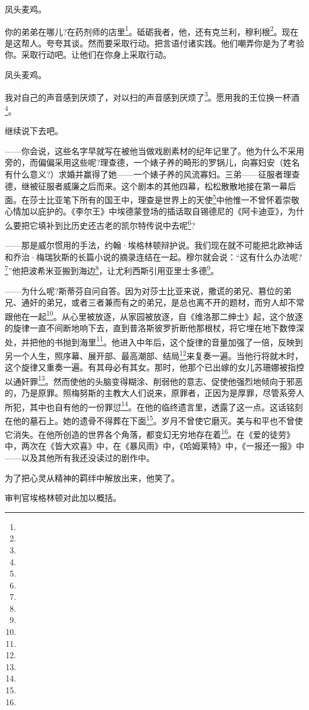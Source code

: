\par 凤头麦鸡。
\par 你的弟弟在哪儿?在药剂师的店里\footnote{}。砥砺我者，他，还有克兰利，穆利根\footnote{}。现在是这帮人。夸夸其谈。然而要采取行动。把言语付诸实践。他们嘲弄你是为了考验你。采取行动吧。让他们在你身上采取行动。
\par 凤头麦鸡。
\par 我对自己的声音感到厌烦了，对以扫的声音感到厌烦了\footnote{}。愿用我的王位换一杯酒\footnote{}。
\par 继续说下去吧。
\par ——你会说，这些名字早就写在被他当做戏剧素材的纪年记里了。他为什么不采用旁的，而偏偏采用这些呢?理查德，一个婊子养的畸形的罗锅儿，向寡妇安（姓名有什么意义?）求婚并赢得了她——一个婊子养的风流寡妇。三弟——征服者理查德，继被征服者威廉之后而来。这个剧本的其他四幕，松松散散地接在第一幕后面。在莎士比亚笔下所有的国王中，理查是世界上的天使\footnote{}中他惟一不曾怀着崇敬心情加以庇护的。《李尔王》中埃德蒙登场的插话取自锡德尼的《阿卡迪亚》，为什么要把它填补到比历史还古老的凯尔特传说中去呢\footnote{}?
\par ——那是威尔惯用的手法，约翰·埃格林顿辩护说。我们现在就不可能把北欧神话和乔治·梅瑞狄斯的长篇小说的摘录连结在一起。穆尔就会说：“这有什么办法呢?\footnote{}”他把波希米亚搬到海边\footnote{}，让尤利西斯引用亚里士多德\footnote{}。
\par ——为什么呢?斯蒂芬自问自答。因为对莎士比亚来说，撒谎的弟兄、篡位的弟兄、通奸的弟兄，或者三者兼而有之的弟兄，是总也离不开的题材，而穷人却不常跟他在一起\footnote{}。从心里被放逐，从家园被放逐，自《维洛那二绅士》起，这个放逐的旋律一直不间断地响下去，直到普洛斯彼罗折断他那根杖，将它埋在地下数倖深处，并把他的书抛到海里\footnote{}。他进入中年后，这个旋律的音量加强了一倍，反映到另一个人生，照序幕、展开部、最高潮部、结局\footnote{}来复奏一遍。当他行将就木时，这个旋律又重奏一遍。有其母必有其女。那时，他那个已出嫁的女儿苏珊娜被指控以通奸罪\footnote{}。然而使他的头脑变得糊涂、削弱他的意志、促使他强烈地倾向于邪恶的，乃是原罪。照梅努斯的主教大人们说来，原罪者，正因为是厚罪，尽管系旁人所犯，其中也自有他的一份罪愆\footnote{}。在他的临终遗言里，透露了这一点。这话铭刻在他的墓石上。她的遗骨不得葬在下面\footnote{}。岁月不曾使它磨灭。美与和平也不曾使它消失。在他所创造的世界各个角落，都变幻无穷地存在着\footnote{}。在《爱的徒劳》中，两次在《皆大欢喜》中，在《暴风雨》中，《哈姆莱特》中，《一报还一报》中——以及其他所有我还没读过的剧作中。
\par 为了把心灵从精神的羁绊中解放出来，他笑了。
\par 审判官埃格林顿对此加以概括。
